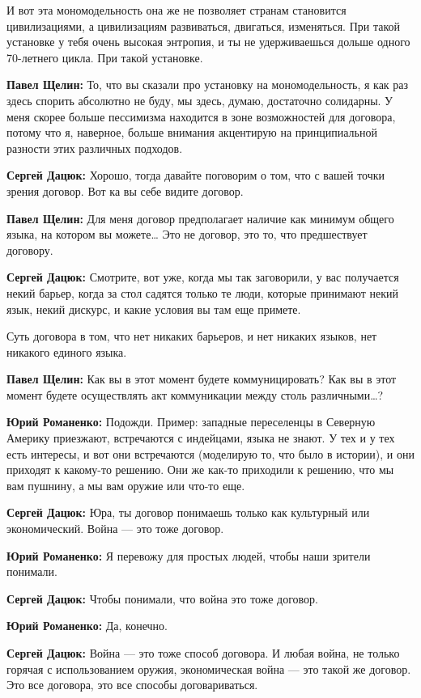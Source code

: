 И вот эта мономодельность она же не позволяет странам становится цивилизациями,
а цивилизациям развиваться, двигаться, изменяться. При такой установке у тебя
очень высокая энтропия, и ты не удерживаешься дольше одного 70-летнего цикла.
При такой установке.

\textbf{Павел Щелин:} То, что вы сказали про установку на мономодельность, я как раз
здесь спорить абсолютно не буду, мы здесь, думаю, достаточно солидарны. У меня
скорее больше пессимизма находится в зоне возможностей для договора, потому что
я, наверное, больше внимания акцентирую на принципиальной разности этих
различных подходов.

\textbf{Сергей Дацюк:} Хорошо, тогда давайте поговорим о том, что с вашей точки зрения
договор. Вот ка вы себе видите договор.

\textbf{Павел Щелин:} Для меня договор предполагает наличие как минимум общего языка, на
котором вы можете… Это не договор, это то, что предшествует договору.

\textbf{Сергей Дацюк:} Смотрите, вот уже, когда мы так заговорили, у вас получается
некий барьер, когда за стол садятся только те люди, которые принимают некий
язык, некий дискурс, и какие условия вы там еще примете.

Суть договора в том, что нет никаких барьеров, и нет никаких языков, нет
никакого единого языка.

\textbf{Павел Щелин:} Как вы в этот момент будете коммуницировать? Как вы в этот момент
будете осуществлять акт коммуникации между столь различными…?

\textbf{Юрий Романенко:} Подожди. Пример: западные переселенцы в Северную Америку
приезжают, встречаются с индейцами, языка не знают. У тех и у тех есть
интересы, и вот они встречаются (моделирую то, что было в истории), и они
приходят к какому-то решению. Они же как-то приходили к решению, что мы вам
пушнину, а мы вам оружие или что-то еще.

\textbf{Сергей Дацюк:} Юра, ты договор понимаешь только как культурный или
экономический. Война — это тоже договор.

\textbf{Юрий Романенко:} Я перевожу для простых людей, чтобы наши зрители понимали.

\textbf{Сергей Дацюк:} Чтобы понимали, что война это тоже договор.

\textbf{Юрий Романенко:} Да, конечно.

\textbf{Сергей Дацюк:} Война — это тоже способ договора. И любая война, не только
горячая с использованием оружия, экономическая война — это такой же договор.
Это все договора, это все способы договариваться.


